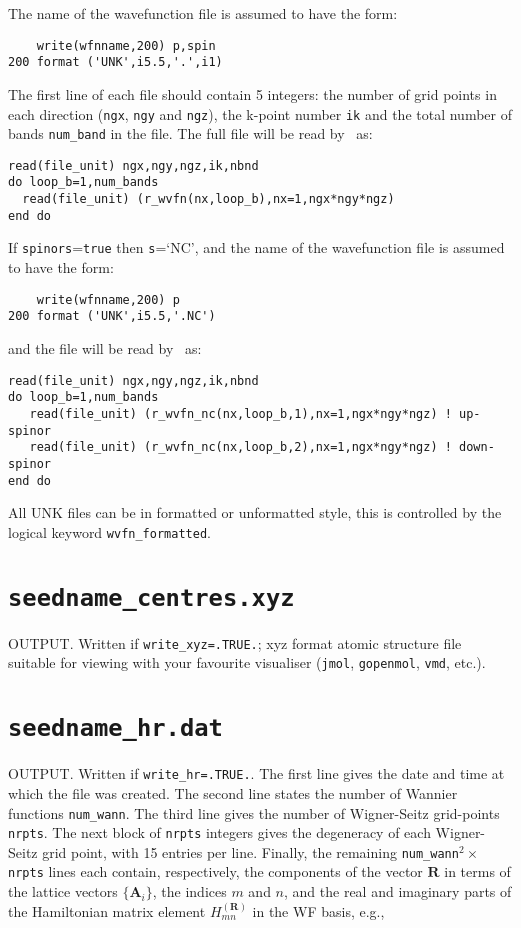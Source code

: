 The name of the wavefunction file is assumed to have the form:

\begin{verbatim}
    write(wfnname,200) p,spin
200 format ('UNK',i5.5,'.',i1)
\end{verbatim}

The first line of each file should contain 5 integers: the number of
 grid points in each direction (\verb#ngx#, \verb#ngy# and
 \verb#ngz#), the k-point number \verb#ik# and the total number of
 bands \verb#num_band# in the file. The full file will be read by \wannier\ as:

\begin{verbatim} 
read(file_unit) ngx,ngy,ngz,ik,nbnd  
do loop_b=1,num_bands
  read(file_unit) (r_wvfn(nx,loop_b),nx=1,ngx*ngy*ngz)
end do
\end{verbatim}

If \verb#spinors#=\verb#true# then \verb#s#=`NC', and the name of the wavefunction file is assumed to have the form:
\begin{verbatim}
    write(wfnname,200) p
200 format ('UNK',i5.5,'.NC')
\end{verbatim}
and the file will be read by \wannier\ as:
\begin{verbatim} 
read(file_unit) ngx,ngy,ngz,ik,nbnd  
do loop_b=1,num_bands
   read(file_unit) (r_wvfn_nc(nx,loop_b,1),nx=1,ngx*ngy*ngz) ! up-spinor
   read(file_unit) (r_wvfn_nc(nx,loop_b,2),nx=1,ngx*ngy*ngz) ! down-spinor
end do  
\end{verbatim}


All  UNK files can be in formatted or unformatted style, this is controlled
by the logical keyword \verb#wvfn_formatted#. 


\section{{\tt seedname\_centres.xyz}}

OUTPUT. Written if {\tt write\_xyz=.TRUE.}; xyz format
atomic structure file suitable for viewing with your favourite
visualiser ({\tt jmol}, {\tt gopenmol}, {\tt vmd}, etc.). 

\section{{\tt seedname\_hr.dat}}

OUTPUT. Written if {\tt write\_hr=.TRUE.}. The first line gives the date and
time at which the file was created. 
The second line states the number of Wannier functions {\tt num\_wann}. The third
line gives the number of Wigner-Seitz grid-points {\tt nrpts}. The next block of 
{\tt nrpts} integers gives the degeneracy of each Wigner-Seitz grid point, with
15 entries per line.
Finally, the remaining {\tt num\_wann}$^2 \times$ {\tt nrpts} lines
each contain, respectively, the components of the vector $\mathbf{R}$
in terms of the lattice vectors $\{\mathbf{A}_{i}\}$, the indices $m$
and $n$, and the real and imaginary parts of the Hamiltonian matrix element
$H_{mn}^{(\mathbf{R})}$ in the WF basis, e.g.,

